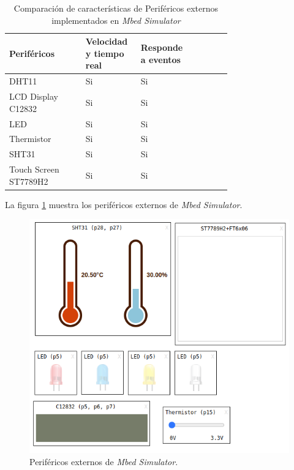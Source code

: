 \begin{table}[h]
\centering
\caption[Comparación de características de Periféricos externos implementados en \textit{Mbed Simulator}]{Comparación de características de Periféricos externos implementados en \textit{Mbed Simulator}}
\begin{tabular}{p{0.30\linewidth} p{0.14\linewidth}  p{0.14\linewidth}  p{0.14\linewidth}}
\toprule
\textbf{Periféricos} 
& \textbf{Velocidad y tiempo real}
& \textbf{Responde a eventos}
\\
\midrule
DHT11 & Si & Si  \\
LCD Display C12832 & Si & Si  \\
LED & Si & Si \\
Thermistor & Si & Si \\
SHT31 & Si & Si \\
Touch Screen ST7789H2 & Si & Si \\
\bottomrule
\hline
\end{tabular}
\label{tab:perifericosExternosMBED}
\end{table}

La figura \ref{fig:perifericosMbed} muestra los periféricos externos de \textit{Mbed Simulator}.
\hfill \break
\hfill \break
\hfill \break
\hfill \break
\hfill \break

\begin{figure}[ht]
	\centering
	\includegraphics[scale=.81]{./Figures/perifericosMBED.png}
	\caption{Periféricos externos de \textit{Mbed Simulator}.}
	\label{fig:perifericosMbed}
\end{figure}

